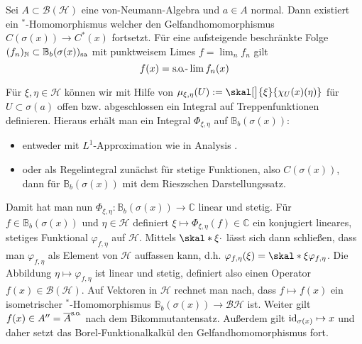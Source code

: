 \begin{satz}[label=satz:615,name={Borel-Funktionalkalkül}]
	Sei $A \subset \mathcal{B}(\mathcal{H})$ eine von-Neumann-Algebra und $a \in A$ normal.
	Dann existiert ein $^*$-Homomorphismus
	welcher den Gelfandhomomorphismus $C(\sigma(x)) \to C^*(x)$ fortsetzt.
	Für eine aufsteigende beschränkte Folge $(f_n)_\mathbb{N} \subset \mathbb{B}_b(\sigma(x))_{\mathrm{sa}}$ mit punktweisem Limes $f=\lim_n f_n$ gilt
	\[
		f(x) =\mathrm{\mkern.3mu s\mkern-1.4mu.\mkern-.6mu o\mkern-1.7mu.}\text{-}\lim f_n(x)
	\]
\end{satz}
\begin{beweis}[name={Skizze}]
	Für $\xi,\eta \in \mathcal{H}$ können wir mit Hilfe von
	\(
		\mu_{\xi,\eta}(U) := \skal[\big]{\xi}{\chi_U(x)(\eta)}
	\)
	für $U \subset \sigma(a)$ offen bzw. abgeschlossen ein Integral auf Treppenfunktionen definieren.
	Hieraus erhält man ein Integral $\Phi_{\xi,\eta}$ auf $\mathbb{B}_b(\sigma(x))$:
	\begin{itemize}[itemsep=0pt]
		\item entweder mit $L^1$-Approximation wie in Analysis .
		\item oder als Regelintegral zunächst für stetige Funktionen, also $C(\sigma(x))$, dann für $\mathbb{B}_b(\sigma(x))$ mit dem Rieszschen Darstellungssatz.
	\end{itemize}
	Damit hat man nun $\Phi_{\xi,\eta} \colon \mathbb{B}_b(\sigma(x)) \to \mathbb{C}$ linear und stetig.
	Für $f \in \mathbb{B}_b(\sigma(x))$ und $\eta \in \mathcal{H}$ definiert $\xi \mapsto \Phi_{\xi,\eta}(f) \in \mathbb{C}$ ein konjugiert lineares, stetiges Funktional $\varphi_{f,\eta}$ auf $\mathcal{H}$.
	Mittels $\skal*{\xi}{\cdot }$ lässt sich dann schließen, dass man $\varphi_{f,\eta}$ als Element von $\mathcal{H}$ auffassen kann, d.h. $\varphi_{f,\eta}(\xi) = \skal*{\xi}{\varphi_{f,\eta}}$.
	Die Abbildung $\eta \mapsto \varphi_{f,\eta}$ ist linear und stetig, definiert also einen Operator $f(x) \in \mathcal{B}(\mathcal{H})$.
	Auf Vektoren in $\mathcal{H}$ rechnet man nach, dass $f \mapsto f(x)$ ein isometrischer $^*$-Homomorphismus $\mathbb{B}_b(\sigma(x)) \to \mathcal{B}{\mathcal{H}}$ ist. 
	Weiter gilt $f(x) \in A''= \overline{A}^{\mathrm{\mkern.3mu s\mkern-1.4mu.\mkern-.6mu o\mkern-1.7mu.}}$ nach dem Bikommutantensatz.
	Außerdem gilt $\operatorname{id}_{\sigma(x)} \mapsto x$ und daher setzt das Borel-Funktionalkalkül den Gelfandhomomorphismus fort.
\end{beweis}

